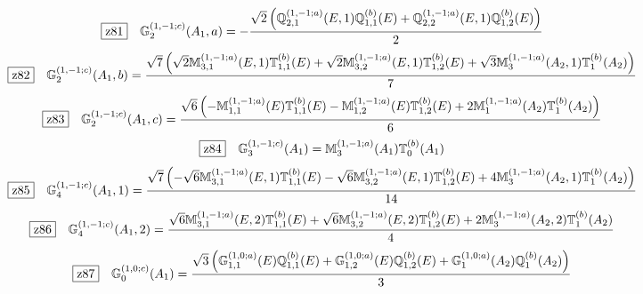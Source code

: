\documentclass[fleqn,10pt,landscape]{jsarticle}
\begin{document}
\begin{dmath*}
\hspace*{3mm}\fbox{z81}\quad \mathbb{G}_{2}^{(1,-1;c)}(A_{1},a)=- \frac{\sqrt{2} \left(\mathbb{Q}_{2,1}^{(1,-1;a)}(E,1) \mathbb{Q}_{1,1}^{(b)}(E) + \mathbb{Q}_{2,2}^{(1,-1;a)}(E,1) \mathbb{Q}_{1,2}^{(b)}(E)\right)}{2}
\end{dmath*}
\begin{dmath*}
\hspace*{3mm}\fbox{z82}\quad \mathbb{G}_{2}^{(1,-1;c)}(A_{1},b)=\frac{\sqrt{7} \left(\sqrt{2} \mathbb{M}_{3,1}^{(1,-1;a)}(E,1) \mathbb{T}_{1,1}^{(b)}(E) + \sqrt{2} \mathbb{M}_{3,2}^{(1,-1;a)}(E,1) \mathbb{T}_{1,2}^{(b)}(E) + \sqrt{3} \mathbb{M}_{3}^{(1,-1;a)}(A_{2},1) \mathbb{T}_{1}^{(b)}(A_{2})\right)}{7}
\end{dmath*}
\begin{dmath*}
\hspace*{3mm}\fbox{z83}\quad \mathbb{G}_{2}^{(1,-1;c)}(A_{1},c)=\frac{\sqrt{6} \left(- \mathbb{M}_{1,1}^{(1,-1;a)}(E) \mathbb{T}_{1,1}^{(b)}(E) - \mathbb{M}_{1,2}^{(1,-1;a)}(E) \mathbb{T}_{1,2}^{(b)}(E) + 2 \mathbb{M}_{1}^{(1,-1;a)}(A_{2}) \mathbb{T}_{1}^{(b)}(A_{2})\right)}{6}
\end{dmath*}
\begin{dmath*}
\hspace*{3mm}\fbox{z84}\quad \mathbb{G}_{3}^{(1,-1;c)}(A_{1})=\mathbb{M}_{3}^{(1,-1;a)}(A_{1}) \mathbb{T}_{0}^{(b)}(A_{1})
\end{dmath*}
\begin{dmath*}
\hspace*{3mm}\fbox{z85}\quad \mathbb{G}_{4}^{(1,-1;c)}(A_{1},1)=\frac{\sqrt{7} \left(- \sqrt{6} \mathbb{M}_{3,1}^{(1,-1;a)}(E,1) \mathbb{T}_{1,1}^{(b)}(E) - \sqrt{6} \mathbb{M}_{3,2}^{(1,-1;a)}(E,1) \mathbb{T}_{1,2}^{(b)}(E) + 4 \mathbb{M}_{3}^{(1,-1;a)}(A_{2},1) \mathbb{T}_{1}^{(b)}(A_{2})\right)}{14}
\end{dmath*}
\begin{dmath*}
\hspace*{3mm}\fbox{z86}\quad \mathbb{G}_{4}^{(1,-1;c)}(A_{1},2)=\frac{\sqrt{6} \mathbb{M}_{3,1}^{(1,-1;a)}(E,2) \mathbb{T}_{1,1}^{(b)}(E) + \sqrt{6} \mathbb{M}_{3,2}^{(1,-1;a)}(E,2) \mathbb{T}_{1,2}^{(b)}(E) + 2 \mathbb{M}_{3}^{(1,-1;a)}(A_{2},2) \mathbb{T}_{1}^{(b)}(A_{2})}{4}
\end{dmath*}
\begin{dmath*}
\hspace*{3mm}\fbox{z87}\quad \mathbb{G}_{0}^{(1,0;c)}(A_{1})=\frac{\sqrt{3} \left(\mathbb{G}_{1,1}^{(1,0;a)}(E) \mathbb{Q}_{1,1}^{(b)}(E) + \mathbb{G}_{1,2}^{(1,0;a)}(E) \mathbb{Q}_{1,2}^{(b)}(E) + \mathbb{G}_{1}^{(1,0;a)}(A_{2}) \mathbb{Q}_{1}^{(b)}(A_{2})\right)}{3}
\end{dmath*}
\end{document}
